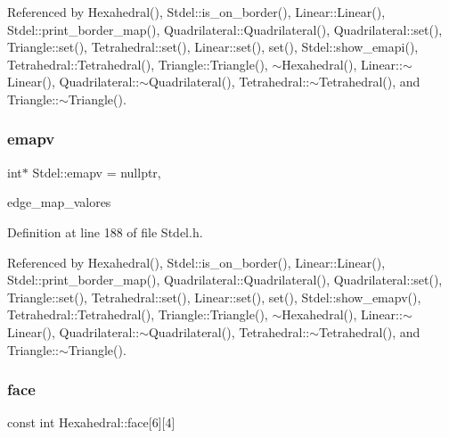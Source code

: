 Referenced by Hexahedral(), Stdel\+::is\+\_\+on\+\_\+border(), Linear\+::\+Linear(), Stdel\+::print\+\_\+border\+\_\+map(), Quadrilateral\+::\+Quadrilateral(), Quadrilateral\+::set(), Triangle\+::set(), Tetrahedral\+::set(), Linear\+::set(), set(), Stdel\+::show\+\_\+emapi(), Tetrahedral\+::\+Tetrahedral(), Triangle\+::\+Triangle(), $\sim$\+Hexahedral(), Linear\+::$\sim$\+Linear(), Quadrilateral\+::$\sim$\+Quadrilateral(), Tetrahedral\+::$\sim$\+Tetrahedral(), and Triangle\+::$\sim$\+Triangle().

\mbox{\label{classStdel_a39326d0ef108403223402c79b424a41b}} 
\subsubsection{\texorpdfstring{emapv}{emapv}}
{\footnotesize\ttfamily int$\ast$ Stdel\+::emapv = nullptr\hspace{0.3cm}{\ttfamily [protected]}, {\ttfamily [inherited]}}



edge\+\_\+map\+\_\+valores 



Definition at line 188 of file Stdel.\+h.



Referenced by Hexahedral(), Stdel\+::is\+\_\+on\+\_\+border(), Linear\+::\+Linear(), Stdel\+::print\+\_\+border\+\_\+map(), Quadrilateral\+::\+Quadrilateral(), Quadrilateral\+::set(), Triangle\+::set(), Tetrahedral\+::set(), Linear\+::set(), set(), Stdel\+::show\+\_\+emapv(), Tetrahedral\+::\+Tetrahedral(), Triangle\+::\+Triangle(), $\sim$\+Hexahedral(), Linear\+::$\sim$\+Linear(), Quadrilateral\+::$\sim$\+Quadrilateral(), Tetrahedral\+::$\sim$\+Tetrahedral(), and Triangle\+::$\sim$\+Triangle().

\mbox{\label{classHexahedral_a65cf7e5570801bd2fa3c5c35b263fbf2}} 
\subsubsection{\texorpdfstring{face}{face}}
{\footnotesize\ttfamily const int Hexahedral\+::face\mbox{[}6\mbox{]}\mbox{[}4\mbox{]}\hspace{0.3cm}{\ttfamily [private]}}

